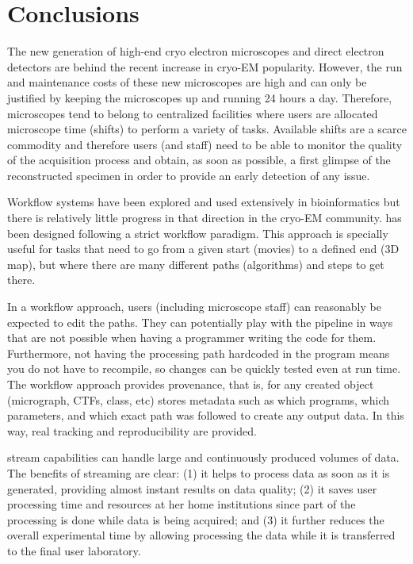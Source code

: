 
\section{Conclusions}

The new generation of high-end cryo electron microscopes and direct electron detectors are behind the recent increase in cryo-EM  popularity. However, the run and maintenance costs of these new microscopes are high and can only be justified by keeping the microscopes up and running 24 hours a day. Therefore, microscopes tend to belong to centralized facilities where users are allocated microscope time (shifts) to perform a variety of tasks. Available shifts are a scarce commodity and therefore users (and staff) need to be able to monitor the quality of the acquisition process and obtain, as soon as possible, a first glimpse of the reconstructed specimen in order to provide an early detection of any issue. 

 Workflow systems have been explored and used extensively in bioinformatics but there is relatively little progress in that direction in the cryo-EM community. \scipion has been designed following a strict workflow paradigm. This approach is specially useful for tasks that need to go from a given start (movies) to a defined end (3D map), but where there are many different paths (algorithms) and steps to get there.
 
 In a workflow approach, users (including microscope staff) can reasonably be expected to edit the paths. They can potentially play with the pipeline in ways that are not possible when having a programmer writing the code for them. Furthermore, not having the processing path hardcoded in the program means you do not have to recompile, so changes can be quickly tested   even at run time. The \scipion workflow approach provides provenance, that is,  for any created object (micrograph, CTFs, class, etc) \scipion stores metadata such as which programs, which parameters, and which exact path was followed to create any output data.  In this way,  real tracking and reproducibility are provided. 

 \scipion stream capabilities can handle large and continuously produced volumes of data. The benefits of streaming are clear: (1) it helps to process data as soon as it is generated,  providing almost instant results on data quality; (2) it saves user processing time and resources at her home institutions since part of the processing is done while data is being acquired; and (3) 
 it further reduces the overall experimental time by allowing processing the data while it is transferred to the final user laboratory. 
 
